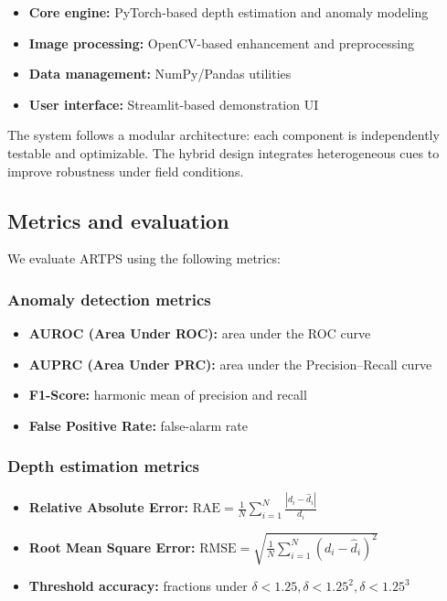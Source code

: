 \documentclass[12pt]{article}
\begin{document}
\begin{itemize}
\item \textbf{Core engine:} PyTorch-based depth estimation and anomaly modeling
\item \textbf{Image processing:} OpenCV-based enhancement and preprocessing \cite{opencv2023}
\item \textbf{Data management:} NumPy/Pandas utilities
\item \textbf{User interface:} Streamlit-based demonstration UI \cite{streamlit2023}
\end{itemize}

The system follows a modular architecture: each component is independently testable and optimizable. The hybrid design integrates heterogeneous cues to improve robustness under field conditions.

\subsection{Metrics and evaluation}
We evaluate ARTPS using the following metrics:

\subsubsection{Anomaly detection metrics}
\begin{itemize}
\item \textbf{AUROC (Area Under ROC):} area under the ROC curve
\item \textbf{AUPRC (Area Under PRC):} area under the Precision--Recall curve
\item \textbf{F1-Score:} harmonic mean of precision and recall
\item \textbf{False Positive Rate:} false-alarm rate
\end{itemize}

\subsubsection{Depth estimation metrics}
\begin{itemize}
\item \textbf{Relative Absolute Error:} \(\text{RAE} = \frac{1}{N} \sum_{i=1}^{N} \frac{|d_i - \hat{d}_i|}{d_i}\)
\item \textbf{Root Mean Square Error:} \(\text{RMSE} = \sqrt{\frac{1}{N} \sum_{i=1}^{N} (d_i - \hat{d}_i)^2}\)
\item \textbf{Threshold accuracy:} fractions under \(\delta < 1.25, \delta < 1.25^2, \delta < 1.25^3\)
\end{itemize}
\end{document}
